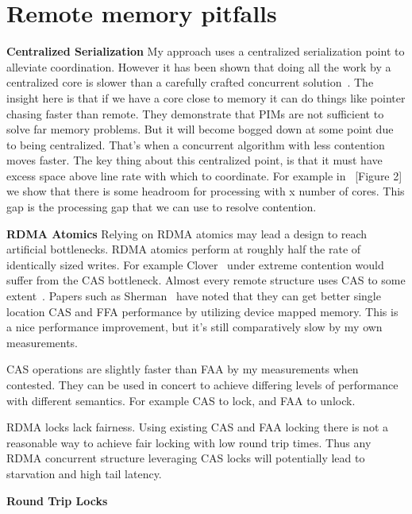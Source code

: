 \section{Remote memory pitfalls}
\label{sec:pitfalls}

\textbf{Centralized Serialization} My approach uses a centralized serialization
point to alleviate coordination. However it has been shown that doing all the
work by a centralized core is slower than a carefully crafted concurrent
solution~\cite{near-memory-structs}. The insight here is that if we have a core
close to memory it can do things like pointer chasing faster than remote. They
demonstrate that PIMs are not sufficient to solve far memory problems. But it
will become bogged down at some point due to being centralized. That's when a
concurrent algorithm with less contention moves faster. The key thing about this
centralized point, is that it must have excess space above line rate with which
to coordinate. For example in ~\cite{fairnic}[Figure 2] we show that there is
some headroom for processing with x number of cores. This gap is the processing
gap that we can use to resolve contention.

\textbf{RDMA Atomics} Relying on RDMA atomics may lead a design to reach
artificial bottlenecks. RDMA atomics perform at roughly half the rate of
identically sized writes. For example Clover~\cite{clover} under extreme
contention would suffer from the CAS bottleneck. Almost every remote structure
uses CAS to some extent~. Papers such as
Sherman~\cite{sherman} have noted that they can get better single location CAS
and FFA performance by utilizing device mapped memory. This is a nice
performance improvement, but it's still comparatively slow by my own
measurements.

CAS operations are slightly faster than FAA by my measurements when contested.
They can be used in concert to achieve differing levels of performance with
different semantics. For example CAS to lock, and FAA to unlock.

RDMA locks lack fairness. Using existing CAS and FAA locking there is not a
reasonable way to achieve fair locking with low round trip times. Thus any RDMA
concurrent structure leveraging CAS locks will potentially lead to starvation
and high tail latency.

\textbf{Round Trip Locks}

